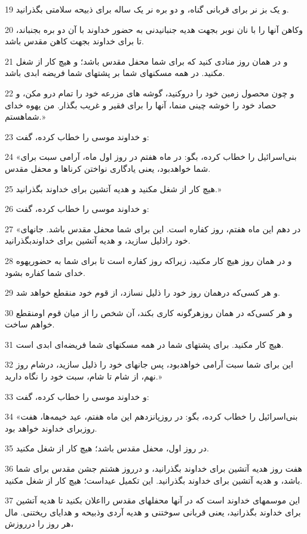 \par 19 و یک بز نر برای قربانی گناه، و دو بره نر یک ساله برای ذبیحه سلامتی بگذرانید.
\par 20 وکاهن آنها را با نان نوبر بجهت هدیه جنبانیدنی به حضور خداوند با آن دو بره بجنباند، تا برای خداوند بجهت کاهن مقدس باشد.
\par 21 و در همان روز منادی کنید که برای شما محفل مقدس باشد؛ و هیچ کار از شغل مکنید. در همه مسکنهای شما بر پشتهای شما فریضه ابدی باشد.
\par 22 و چون محصول زمین خود را دروکنید، گوشه های مزرعه خود را تمام درو مکن، و حصاد خود را خوشه چینی منما، آنها را برای فقیر و غریب بگذار. من یهوه خدای شماهستم.»
\par 23 و خداوند موسی را خطاب کرده، گفت:
\par 24 «بنی‌اسرائیل را خطاب کرده، بگو: در ماه هفتم در روز اول ماه، آرامی سبت برای شما خواهدبود، یعنی یادگاری نواختن کرناها و محفل مقدس.
\par 25 هیچ کار از شغل مکنید و هدیه آتشین برای خداوند بگذرانید.»
\par 26 و خداوند موسی را خطاب کرده، گفت:
\par 27 «در دهم این ماه هفتم، روز کفاره است. این برای شما محفل مقدس باشد. جانهای خود راذلیل سازید، و هدیه آتشین برای خداوندبگذرانید.
\par 28 و در همان روز هیچ کار مکنید، زیراکه روز کفاره است تا برای شما به حضوریهوه خدای شما کفاره بشود.
\par 29 و هر کسی‌که درهمان روز خود را ذلیل نسازد، از قوم خود منقطع خواهد شد.
\par 30 و هر کسی‌که در همان روزهرگونه کاری بکند، آن شخص را از میان قوم اومنقطع خواهم ساخت.
\par 31 هیچ کار مکنید. برای پشتهای شما در همه مسکنهای شما فریضه‌ای ابدی است.
\par 32 این برای شما سبت آرامی خواهدبود، پس جانهای خود را ذلیل سازید، درشام روز نهم، از شام تا شام، سبت خود را نگاه دارید.»
\par 33 و خداوند موسی را خطاب کرده، گفت:
\par 34 «بنی‌اسرائیل را خطاب کرده، بگو: در روزپانزدهم این ماه هفتم، عید خیمه‌ها، هفت روزبرای خداوند خواهد بود.
\par 35 در روز اول، محفل مقدس باشد؛ هیچ کار از شغل مکنید.
\par 36 هفت روز هدیه آتشین برای خداوند بگذرانید، و درروز هشتم جشن مقدس برای شما باشد، و هدیه آتشین برای خداوند بگذرانید. این تکمیل عیداست؛ هیچ کار از شغل مکنید. 
\par 37 این موسمهای خداوند است که در آنها محفلهای مقدس رااعلان بکنید تا هدیه آتشین برای خداوند بگذرانید، یعنی قربانی سوختنی و هدیه آردی وذبیحه و هدایای ریختنی. مال هر روز را درروزش،
